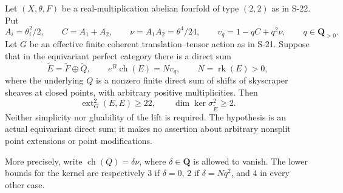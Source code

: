 \begin{proposition}
\label{prop:semireg-rm-point-augmentation}
Let $(X,\theta,F)$ be a real-multiplication abelian fourfold of type
$(2,2)$ as in S-22. Put
\[
 A_i=\theta_i^2/2,\qquad C=A_1+A_2,\qquad
 \nu=A_1A_2=\theta^4/24,
 \qquad v_q=1-qC+q^2\nu,
 \qquad q\in\mathbf Q_{>0}.
\]
Let $G$ be an effective finite coherent translation--tensor action as in
S-21. Suppose that in the equivariant perfect category there is a direct sum
\[
 \widetilde E=\widetilde F\oplus\widetilde Q,
 \qquad e^B\operatorname{ch}(E)=Nv_q,
 \qquad N=\operatorname{rk}(E)>0,
 \tag{S39.1}
\]
where the underlying $Q$ is a nonzero finite direct sum of shifts of
skyscraper sheaves at closed points, with arbitrary positive multiplicities.
Then
\[
 \operatorname{ext}^2_G(E,E)\ge22,
 \qquad \dim\ker\sigma^2_{\widetilde E}\ge2.
 \tag{S39.2}
\]
Neither simplicity nor gluability of the lift is required. The hypothesis
is an actual equivariant direct sum; it makes no assertion about arbitrary
nonsplit point extensions or point modifications.

More precisely, write $\operatorname{ch}(Q)=\delta\nu$, where
$\delta\in\mathbf Q$ is allowed to vanish. The lower bounds for the
kernel are respectively $3$ if $\delta=0$, $2$ if
$\delta=Nq^2$, and $4$ in every other case.
\end{proposition}
